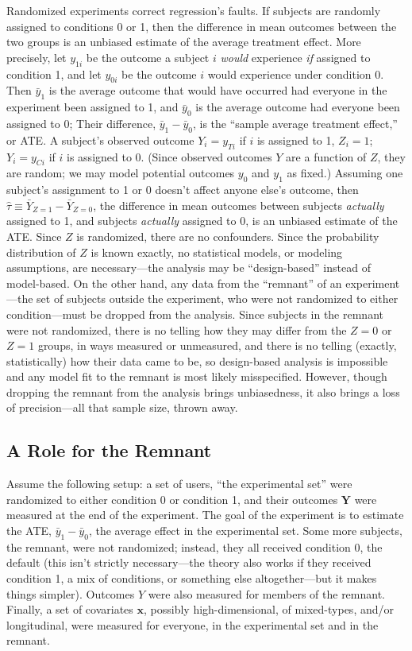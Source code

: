 \documentclass{edm_template}
\newcommand{\yti}{y_{Ti}}
\newcommand{\yci}{y_{Ci}}
\newcommand{\tauhat}{\hat{\tau}}
\begin{document}
Randomized experiments correct regression's faults. 
If subjects are randomly assigned to conditions 0 or 1, then the difference in mean outcomes between the two groups is an unbiased estimate of the average treatment effect.
More precisely, let $y_{1i}$ be the outcome a subject $i$ \emph{would} experience \emph{if} assigned to condition 1, and let $y_{0i}$ be the outcome $i$ would experience under condition 0.
Then $\bar{y}_1$ is the average outcome that would have occurred had everyone in the experiment been assigned to 1, and $\bar{y}_0$ is the average outcome had everyone been assigned to 0; Their difference, $\bar{y}_1-\bar{y}_0$, is the ``sample average treatment effect,'' or ATE.
A subject's observed outcome $Y_i=\yti$ if $i$ is assigned to 1, $Z_i=1$; $Y_i=\yci$ if $i$ is assigned to 0. 
(Since observed outcomes $Y$ are a function of $Z$, they are random; we may model potential outcomes $y_0$ and $y_1$ as fixed.)
Assuming one subject's assignment to 1 or 0 doesn't affect anyone else's outcome, then $\tauhat\equiv\bar{Y}_{Z=1}-\bar{Y}_{Z=0}$, the difference in mean outcomes between subjects \emph{actually} assigned to 1, and subjects \emph{actually} assigned to 0, is an unbiased estimate of the ATE.
Since $Z$ is randomized, there are no confounders. 
Since the probability distribution of $Z$ is known exactly, no statistical models, or modeling assumptions, are necessary---the analysis may be ``design-based'' instead of model-based.  
On the other hand, any data from the ``remnant'' of an experiment---the set of subjects outside the experiment, who were not randomized to either condition---must be dropped from the analysis. 
Since subjects in the remnant were not randomized, there is no telling how they may differ from the $Z=0$ or $Z=1$ groups, in ways measured or unmeasured, and there is no telling (exactly, statistically) how their data came to be, so design-based analysis is impossible and any model fit to the remnant is most likely misspecified. 
However, though dropping the remnant from the analysis brings unbiasedness, it also brings a loss of precision---all that sample size, thrown away. 

\subsection{A Role for the Remnant} 
Assume the following setup:
a set of users, ``the experimental set'' were randomized to either condition 0 or condition 1, and their outcomes $\bm{Y}$ were measured at the end of the experiment.
The goal of the experiment is to estimate the ATE, $\bar{y}_1-\bar{y}_0$, the average effect in the experimental set. 
Some more subjects, the remnant, were not randomized; instead, they all received condition 0, the default (this isn't strictly necessary---the theory also works if they received condition 1, a mix of conditions, or something else altogether---but it makes things simpler). 
Outcomes $Y$ were also measured for members of the remnant.
Finally, a set of covariates $\bm{x}$, possibly high-dimensional, of mixed-types, and/or longitudinal, were measured for everyone, in the experimental set and in the remnant. 
\end{document}
